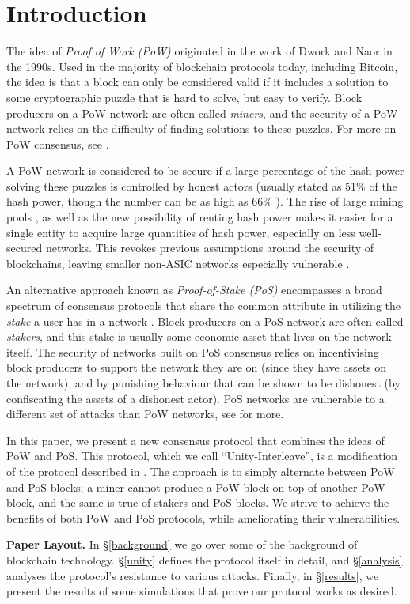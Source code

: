 \section{Introduction}
\label{intro}

The idea of \emph{Proof of Work (PoW)} originated in the work of Dwork and Naor
in the 1990s\cite{dwork-naor}. Used in the majority of blockchain protocols today, including
Bitcoin, the idea is that a block can only be considered valid if it includes
a solution to some cryptographic puzzle that is hard to solve, but easy to verify. 
Block producers on a PoW network are often called \emph{miners}, and 
the security of a PoW network relies on the difficulty of finding solutions
to these puzzles. For more on PoW consensus, see \cite{nakamoto2008}.

A PoW network is considered to be secure if a large percentage of the hash power
solving these puzzles is controlled by honest actors (usually stated as 51\% of the hash power,
though the number can be as high as 66\% \cite{selfish_mining}). 
The rise of large mining pools \cite{aliaga2018}, as well as the new possibility of renting
hash power makes it easier for a single entity to acquire large quantities of hash power,
especially on less well-secured networks. This revokes previous assumptions around
the security of blockchains, leaving smaller non-ASIC networks especially vulnerable \cite{sinnige2018}.

An alternative approach known as \emph{Proof-of-Stake (PoS)} encompasses a broad spectrum of
consensus protocols that share the common attribute in utilizing the \textit{stake} a user has in a network \cite{BentovGM14}.
Block producers on a PoS network are often called \emph{stakers}, and 
this stake is usually some economic asset that lives on the network itself.
The security of networks built on PoS consensus relies on incentivising block producers
to support the network they are on (since they have assets on the network), and by 
punishing behaviour that can be shown to be dishonest (by confiscating the assets of
a dishonest actor). PoS networks are vulnerable to a different set of attacks than PoW networks,
see \cite{brown2018formal} for more.

In this paper, we present a new consensus protocol that combines the ideas
of PoW and PoS. This protocol, which we call ``Unity-Interleave'', is a modification
of the protocol described in \cite{wu2019unifying}.
The approach is to simply alternate between PoW and PoS blocks; a miner
cannot produce a PoW block on top of another PoW block, and the same is
true of stakers and PoS blocks. We strive to achieve the benefits of both PoW and
PoS protocols, while ameliorating their vulnerabilities.

\textbf{Paper Layout.} In \S\ref{background} we go over some of the background of blockchain technology.
\S\ref{unity} defines the protocol itself in detail, and \S\ref{analysis} 
analyses the protocol's resistance to various attacks. Finally, in \S\ref{results},
we present the results of some simulations that prove our protocol works as desired.